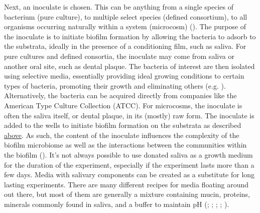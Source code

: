 \documentclass[
  b5paper,
]{book}
\begin{document}
Next, an inoculate is chosen. This can be anything from a single species
of bacterium (pure culture), to multiple select species (defined
consortium), to all organisms occurring naturally within a system
(microcosm) (). The
purpose of the inoculate is to initiate biofilm formation by allowing
the bacteria to adsorb to the substrata, ideally in the presence of a
conditioning film, such as saliva. For pure cultures and defined
consortia, the inoculate may come from saliva or another oral site, such
as dental plaque. The bacteria of interest are then isolated using
selective media, essentially providing ideal growing conditions to
certain types of bacteria, promoting their growth and eliminating others
(e.g. ). Alternatively, the bacteria can be acquired directly from
companies like the American Type Culture Collection (ATCC). For
microcosms, the inoculate is often the saliva itself, or dental plaque,
in its (mostly) raw form. The inoculate is added to the wells to
initiate biofilm formation on the substrata as described
\hyperref[dental-plaque]{above}. As such, the content of the inoculate
influences the complexity of the biofilm microbiome as well as the
interactions between the communities within the biofilm
(). It's
not always possible to use donated saliva as a growth medium for the
duration of the experiment, especially if the experiment lasts more than
a few days. Media with salivary components can be created as a
substitute for long lasting experiments. There are many different
recipes for media floating around out there, but most of them are
generally a mixture containing mucin, proteins, minerals commonly found
in saliva, and a buffer to maintain pH
(;
;
;
;
).
\end{document}
